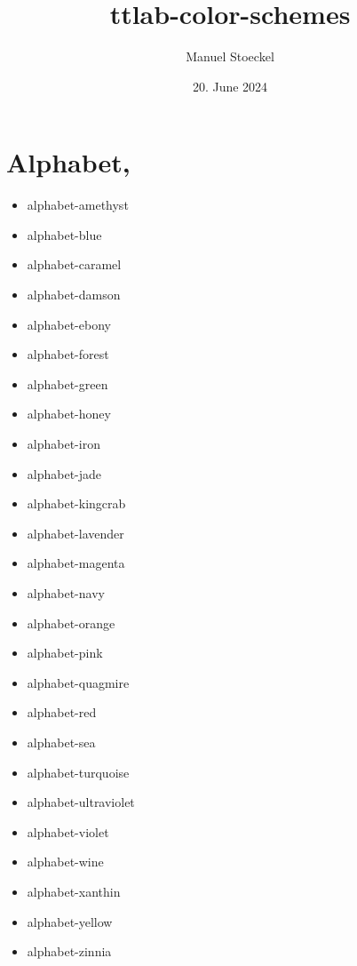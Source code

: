 \documentclass{article}
\title{ttlab-color-schemes}
\author{Manuel Stoeckel}
\date{20. June 2024}
\begin{document}
\maketitle

\section{Alphabet, \textcite{carter-1982-high}}

\begin{multicols}{2}
    \begin{itemize}
        \item \textcolor{alphabet-amethyst}{alphabet-amethyst}
        \item \textcolor{alphabet-blue}{alphabet-blue}
        \item \textcolor{alphabet-caramel}{alphabet-caramel}
        \item \textcolor{alphabet-damson}{alphabet-damson}
        \item \textcolor{alphabet-ebony}{alphabet-ebony}
        \item \textcolor{alphabet-forest}{alphabet-forest}
        \item \textcolor{alphabet-green}{alphabet-green}
        \item \textcolor{alphabet-honey}{alphabet-honey}
        \item \textcolor{alphabet-iron}{alphabet-iron}
        \item \textcolor{alphabet-jade}{alphabet-jade}
        \item \textcolor{alphabet-kingcrab}{alphabet-kingcrab}
        \item \textcolor{alphabet-lavender}{alphabet-lavender}
        \item \textcolor{alphabet-magenta}{alphabet-magenta}
        \item \textcolor{alphabet-navy}{alphabet-navy}
        \item \textcolor{alphabet-orange}{alphabet-orange}
        \item \textcolor{alphabet-pink}{alphabet-pink}
        \item \textcolor{alphabet-quagmire}{alphabet-quagmire}
        \item \textcolor{alphabet-red}{alphabet-red}
        \item \textcolor{alphabet-sea}{alphabet-sea}
        \item \textcolor{alphabet-turquoise}{alphabet-turquoise}
        \item \textcolor{alphabet-ultraviolet}{alphabet-ultraviolet}
        \item \textcolor{alphabet-violet}{alphabet-violet}
        \item \textcolor{alphabet-wine}{alphabet-wine}
        \item \textcolor{alphabet-xanthin}{alphabet-xanthin}
        \item \textcolor{alphabet-yellow}{alphabet-yellow}
        \item \textcolor{alphabet-zinnia}{alphabet-zinnia}
    \end{itemize}
\end{multicols}
\end{document}
